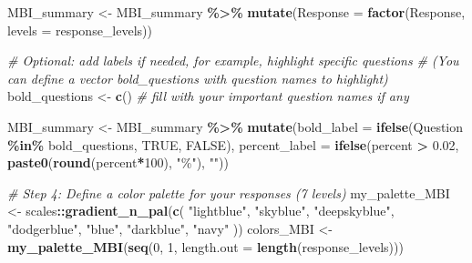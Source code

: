 \documentclass[
]{article}
\newenvironment{Shaded}{\begin{snugshade}}{\end{snugshade}}
\newcommand{\AttributeTok}[1]{\textcolor[rgb]{0.13,0.29,0.53}{#1}}
\newcommand{\CommentTok}[1]{\textcolor[rgb]{0.56,0.35,0.01}{\textit{#1}}}
\newcommand{\ConstantTok}[1]{\textcolor[rgb]{0.56,0.35,0.01}{#1}}
\newcommand{\DecValTok}[1]{\textcolor[rgb]{0.00,0.00,0.81}{#1}}
\newcommand{\FloatTok}[1]{\textcolor[rgb]{0.00,0.00,0.81}{#1}}
\newcommand{\FunctionTok}[1]{\textcolor[rgb]{0.13,0.29,0.53}{\textbf{#1}}}
\newcommand{\NormalTok}[1]{#1}
\newcommand{\OtherTok}[1]{\textcolor[rgb]{0.56,0.35,0.01}{#1}}
\newcommand{\SpecialCharTok}[1]{\textcolor[rgb]{0.81,0.36,0.00}{\textbf{#1}}}
\newcommand{\StringTok}[1]{\textcolor[rgb]{0.31,0.60,0.02}{#1}}
\begin{document}
\begin{Shaded}
\begin{Highlighting}[]
\NormalTok{MBI\_summary }\OtherTok{\textless{}{-}}\NormalTok{ MBI\_summary }\SpecialCharTok{\%\textgreater{}\%}
  \FunctionTok{mutate}\NormalTok{(}\AttributeTok{Response =} \FunctionTok{factor}\NormalTok{(Response, }\AttributeTok{levels =}\NormalTok{ response\_levels))}

\CommentTok{\# Optional: add labels if needed, for example, highlight specific questions}
\CommentTok{\# (You can define a vector \textasciigrave{}bold\_questions\textasciigrave{} with question names to highlight)}
\NormalTok{bold\_questions }\OtherTok{\textless{}{-}} \FunctionTok{c}\NormalTok{() }\CommentTok{\# fill with your important question names if any}

\NormalTok{MBI\_summary }\OtherTok{\textless{}{-}}\NormalTok{ MBI\_summary }\SpecialCharTok{\%\textgreater{}\%}
  \FunctionTok{mutate}\NormalTok{(}\AttributeTok{bold\_label =} \FunctionTok{ifelse}\NormalTok{(Question }\SpecialCharTok{\%in\%}\NormalTok{ bold\_questions, }\ConstantTok{TRUE}\NormalTok{, }\ConstantTok{FALSE}\NormalTok{),}
         \AttributeTok{percent\_label =} \FunctionTok{ifelse}\NormalTok{(percent }\SpecialCharTok{\textgreater{}} \FloatTok{0.02}\NormalTok{, }\FunctionTok{paste0}\NormalTok{(}\FunctionTok{round}\NormalTok{(percent}\SpecialCharTok{*}\DecValTok{100}\NormalTok{), }\StringTok{"\%"}\NormalTok{), }\StringTok{""}\NormalTok{))}

\CommentTok{\# Step 4: Define a color palette for your responses (7 levels)}
\NormalTok{my\_palette\_MBI }\OtherTok{\textless{}{-}}\NormalTok{ scales}\SpecialCharTok{::}\FunctionTok{gradient\_n\_pal}\NormalTok{(}\FunctionTok{c}\NormalTok{(}
  \StringTok{"lightblue"}\NormalTok{, }\StringTok{"skyblue"}\NormalTok{, }\StringTok{"deepskyblue"}\NormalTok{, }
  \StringTok{"dodgerblue"}\NormalTok{, }\StringTok{"blue"}\NormalTok{, }\StringTok{"darkblue"}\NormalTok{, }\StringTok{"navy"}
\NormalTok{))}
\NormalTok{colors\_MBI }\OtherTok{\textless{}{-}} \FunctionTok{my\_palette\_MBI}\NormalTok{(}\FunctionTok{seq}\NormalTok{(}\DecValTok{0}\NormalTok{, }\DecValTok{1}\NormalTok{, }\AttributeTok{length.out =} \FunctionTok{length}\NormalTok{(response\_levels)))}


\end{Highlighting}
\end{Shaded}
\end{document}
